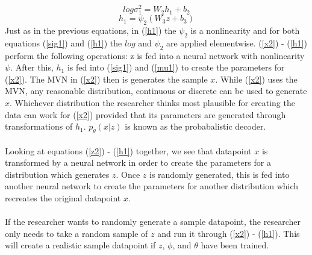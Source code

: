 \documentclass[10pt]{article}
\begin{document}
\begin{equation}\label{sig1}
log\sigma^2_1 = W_2h_1 + b_2   
\end{equation}
\begin{equation}\label{h1}
h_1 = \psi_{2}(W_3z+b_3)
\end{equation}
%
%
Just as in the previous equations, in (\ref{h1}) the $\psi_{2}$ is a nonlinearity and for both equations (\ref{sig1}) and 
(\ref{h1}) the $log$ and $\psi_{2}$ are applied elementwise.  (\ref{x2}) - (\ref{h1}) perform the following operations: 
z is fed into a neural network
with nonlinearity $\psi$.  After this, $h_1$ is fed into (\ref{sig1}) and (\ref{mu1}) to create the parameters for 
(\ref{x2}).  The MVN in (\ref{x2}) then is generates the sample $x$.  While (\ref{x2}) uses the MVN, any reasonable
distribution, continuous or discrete can be used to generate $x$.  Whichever distribution the researcher thinks
most plausible for creating the data can work for (\ref{x2}) provided that its parameters are generated through 
transformations of $h_1$.  $p_{\theta}(x|z)$ is known as the probabalistic decoder.  \\ \\
%
%
Looking at equations (\ref{z2}) - (\ref{h1}) together, we see that datapoint $x$ is transformed by 
a neural network in order to create the parameters for a distribution which generates $z$.  Once $z$ is
randomly generated, this is fed into another neural network to create the parameters for another
distribution which recreates the original datapoint $x$.   \\ \\
If the researcher wants to randomly generate a sample datapoint, the researcher only needs to 
take a random sample of $z$ and run it through (\ref{x2}) - (\ref{h1}).  This will create a realistic
sample datapoint if $z$, $\phi$, and $\theta$ have been trained.  
%
%
\end{document}
